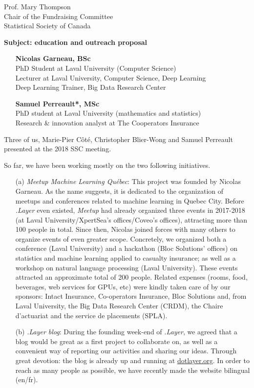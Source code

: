 \documentclass[11pt, a4paper]{letter} %
\begin{document}
\begin{letter}{
	Prof. Mary Thompson\\
	Chair of the Fundraising Committee\\
	Statistical Society of Canada
	
	\bigskip
	\textbf{Subject: education and outreach proposal}%
}
\begin{enumerate}
	\quad Teaching chair on big data analysis for actuarial science --- Intact\\
	\quad Member of the \emph{New Investigators Committee} of the \emph{SSC}
	\item[] \textbf{Nicolas Garneau, BSc}\\
	\quad PhD Student at Laval University (Computer Science)\\
	Lecturer at Laval University, Computer Science, Deep Learning\\
	Deep Learning Trainer, Big Data Research Center
	\item[] \textbf{Samuel Perreault*, MSc}\\
	\quad PhD student at Laval University (mathematics and statistics)\\
	\quad Research \& innovation analyst at The Cooperators Insurance
\end{enumerate}

\noindent Three of us, Marie-Pier Côté, Christopher Blier-Wong and Samuel Perreault presented at the 2018 SSC meeting.

\noindent So far, we have been working mostly on the two following initiatives.
\begin{enumerate}
	\item[(a)] \emph{Meetup Machine Learning Québec}: This project was founded by Nicolas Garneau. As the name suggests, it is dedicated to the organization of meetups and conferences related to machine learning in Quebec City. Before \emph{.Layer} even existed, \emph{Meetup} had already organized three events in 2017-2018 (at Laval University/XpertSea's offices/Coveo's offices), attracting more than 100 people in total. Since then, Nicolas joined forces with many others to organize events of even greater scope. Concretely, we organized both a conference (Laval University) and a hackathon (Bloc Solutions' offices) on statistics and machine learning applied to casualty insurance; as well as a workshop on natural language processing (Laval University). These events attracted an approximate total of 200 people. Related expenses (rooms, food, beverages, web services for GPUs, etc) were kindly taken care of by our sponsors: Intact Insurance, Co-operators Insurance, Bloc Solutions and, from Laval University, the Big Data Research Center (CRDM), the Chaire d'actuariat and the service de placements (SPLA).
	\item[(b)] \emph{.Layer blog}: During the founding week-end of \emph{.Layer}, we agreed that a blog would be great as a first project to collaborate on, as well as a convenient way of reporting our activities and sharing our ideas. Through great devotion: the blog is already up and running at \href{https://www.dotlayer.org/}{dotlayer.org}. In order to reach as many people as possible, we have recently made the website bilingual (en/fr).
\end{enumerate}


\end{letter}
\end{document}
